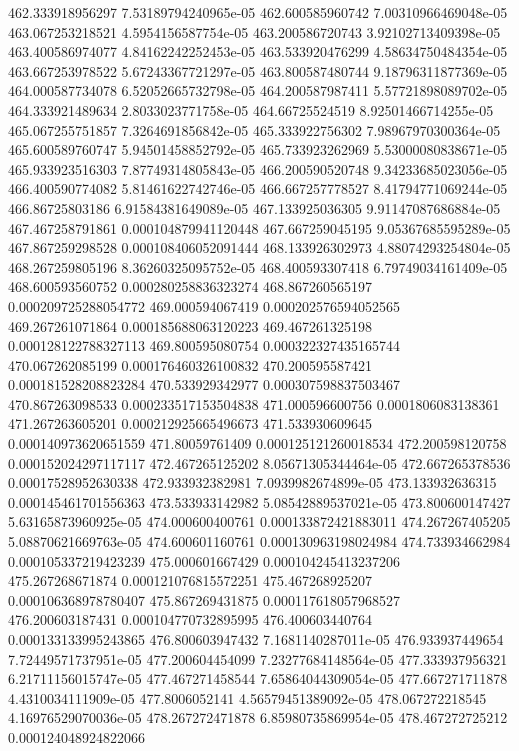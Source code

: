 {462.333918956297 7.53189794240965e-05
462.600585960742 7.00310966469048e-05
463.067253218521 4.5954156587754e-05
463.200586720743 3.92102713409398e-05
463.400586974077 4.84162242252453e-05
463.533920476299 4.58634750484354e-05
463.667253978522 5.67243367721297e-05
463.800587480744 9.18796311877369e-05
464.000587734078 6.52052665732798e-05
464.200587987411 5.57721898089702e-05
464.333921489634 2.8033023771758e-05
464.66725524519 8.92501466714255e-05
465.067255751857 7.3264691856842e-05
465.333922756302 7.98967970300364e-05
465.600589760747 5.94501458852792e-05
465.733923262969 5.53000080838671e-05
465.933923516303 7.87749314805843e-05
466.200590520748 9.34233685023056e-05
466.400590774082 5.81461622742746e-05
466.667257778527 8.41794771069244e-05
466.86725803186 6.91584381649089e-05
467.133925036305 9.91147087686884e-05
467.467258791861 0.000104879941120448
467.667259045195 9.05367685595289e-05
467.867259298528 0.000108406052091444
468.133926302973 4.88074293254804e-05
468.267259805196 8.36260325095752e-05
468.400593307418 6.79749034161409e-05
468.600593560752 0.000280258836323274
468.867260565197 0.000209725288054772
469.000594067419 0.000202576594052565
469.267261071864 0.000185688063120223
469.467261325198 0.000128122788327113
469.800595080754 0.000322327435165744
470.067262085199 0.000176460326100832
470.200595587421 0.000181528208823284
470.533929342977 0.000307598837503467
470.867263098533 0.000233517153504838
471.000596600756 0.0001806083138361
471.267263605201 0.000212925665496673
471.533930609645 0.000140973620651559
471.80059761409 0.000125121260018534
472.200598120758 0.000152024297117117
472.467265125202 8.05671305344464e-05
472.667265378536 0.00017528952630338
472.933932382981 7.0939982674899e-05
473.133932636315 0.000145461701556363
473.533933142982 5.08542889537021e-05
473.800600147427 5.63165873960925e-05
474.000600400761 0.000133872421883011
474.267267405205 5.08870621669763e-05
474.600601160761 0.000130963198024984
474.733934662984 0.000105337219423239
475.000601667429 0.000104245413237206
475.267268671874 0.000121076815572251
475.467268925207 0.000106368978780407
475.867269431875 0.000117618057968527
476.200603187431 0.000104770732895995
476.400603440764 0.000133133995243865
476.800603947432 7.1681140287011e-05
476.933937449654 7.72449571737951e-05
477.200604454099 7.23277684148564e-05
477.333937956321 6.21711156015747e-05
477.467271458544 7.65864044309054e-05
477.667271711878 4.4310034111909e-05
477.8006052141 4.56579451389092e-05
478.067272218545 4.16976529070036e-05
478.267272471878 6.85980735869954e-05
478.467272725212 0.000124048924822066
}
